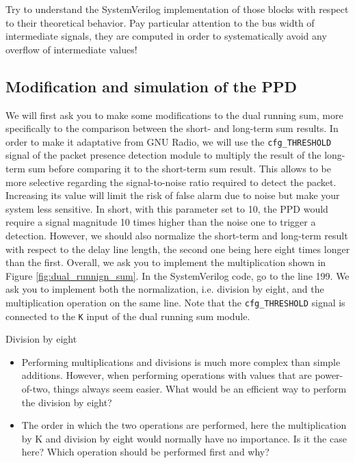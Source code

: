 Try to understand the SystemVerilog implementation of those blocks with respect to their theoretical behavior. Pay particular attention to the bus width of intermediate signals, they are computed in order to systematically avoid any overflow of intermediate values!


\subsection{Modification and simulation of the PPD}


We will first ask you to make some modifications to the dual running sum, more specifically to the comparison between the short- and long-term sum results. In order to make it adaptative from GNU Radio, we will use the \texttt{cfg\_THRESHOLD} signal of the packet presence detection module to multiply the result of the long-term sum before comparing it to the short-term sum result. This allows to be more selective regarding the signal-to-noise ratio required to detect the packet. Increasing its value will limit the risk of false alarm due to noise but make your system less sensitive. In short, with this parameter set to 10, the PPD would require a signal magnitude 10 times higher than the noise one to trigger a detection. However, we should also normalize the short-term and long-term result with respect to the delay line length, the second one being here eight times longer than the first. Overall, we ask you to implement the multiplication shown in Figure \ref{fig:dual_runnign_sum}. In the SystemVerilog code, go to the line 199. We ask you to implement both the normalization, i.e. division by eight, and the multiplication operation on the same line. Note that the \texttt{cfg\_THRESHOLD} signal is connected to the \texttt{K} input of the dual running sum module.


\begin{bclogo}[couleur = gray!20, arrondi = 0.2, logo=\bcquestion]{Division by eight}
    \begin{itemize}
        \item Performing multiplications and divisions is much more complex than simple additions. However, when performing operations with values that are power-of-two, things always seem easier. What would be an efficient way to perform the division by eight?
        \item The order in which the two operations are performed, here the multiplication by K and division by eight would normally have no importance. Is it the case here? Which operation should be performed first and why?
    \end{itemize}
\end{bclogo}

